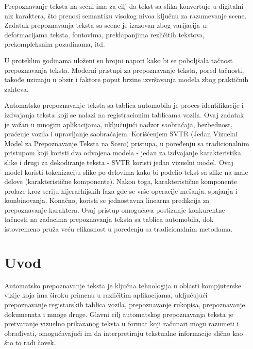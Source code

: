 \documentclass[a4paper,12pt]{article}
\begin{document}
	Prepoznavanje teksta na sceni ima za cilj da tekst sa slika konvertuje u digitalni niz karaktera, što prenosi semantiku visokog nivoa ključnu za razumevanje scene. Zadatak prepoznavanja teksta sa scene je izazovan zbog varijacija u: deformacijama teksta, fontovima, preklapanjima rezličitih tekstova, prekompleksnim pozadinama, itd.
	
	U proteklim godinama uloženi su brojni napori kako bi se poboljšala tačnost prepoznavanja teksta. Moderni pristupi za prepoznavanje teksta, pored tačnosti, takođe uzimaju u obzir i faktore poput brzine izvršavanja modela zbog praktičnih zahteva.
	\par
	Automatsko prepoznavanje teksta sa tablica automobila je proces identifikacije i izdvajanja teksta koji se nalazi na registracionim tablicama vozila. Ovaj zadatak je važan u mnogim aplikacijama, uključujući nadzor saobraćaja, bezbednost, praćenje vozila i upravljanje saobraćajem. Korišćenjem SVTR (Jedan Vizuelni Model za Prepoznavanje Teksta na Sceni) pristupa, u poređenju sa tradicionalnim pristupom koji koristi dva odvojena modela - jedan za izdvajanje karakteristika slike i drugi za dekodiranje teksta - SVTR koristi jedan vizuelni model. Ovaj model koristi tokenizaciju slike po delovima kako bi podelio tekst sa slike na male delove (karakteristične komponente). Nakon toga, karakteristične komponente prolaze kroz seriju hijerarhijskih faza gde se vrše operacije mešanja, spajanja i kombinovanja. Konačno, koristi se jednostavna linearna predikcija za prepoznavanje karaktera. Ovaj pristup omogućava postizanje konkurentne tačnosti na zadacima prepoznavanja teksta sa tablica automobila, dok istovremeno pruža veću efikasnost u poređenju sa tradicionalnim metodama.
	\newpage
	
	\section{Uvod}
	Automatsko prepoznavanje teksta je ključna tehnologija u oblasti kompjuterske vizije koja ima široku primenu u različitim aplikacijama, uključujući prepoznavanje registarskih tablica vozila, prepoznavanje rukopisa, prepoznavanje dokumenata i mnoge druge. Glavni cilj automatskog prepoznavanja teksta je pretvaranje vizuelno prikazanog teksta u format koji računari mogu razumeti i obrađivati, omogućavajući im da interpretiraju tekstualne informacije slično kao što to radi čovek.
	\newline
	
\end{document}
